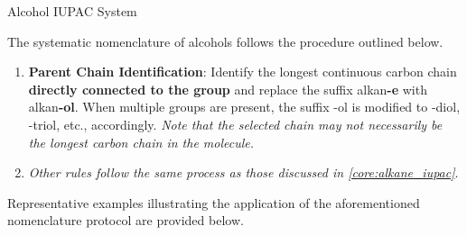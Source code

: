\documentclass[10pt]{article}
\begin{document}
      \begin{core}[label=core:alcohol_iupac]{Alcohol IUPAC System}

        The systematic nomenclature of alcohols follows the procedure outlined below.

        \begin{enumerate}[label=(\arabic*)]

          \item \textbf{Parent Chain Identification}: Identify the longest continuous carbon chain \textbf{directly connected to the  group} and replace the suffix alkan\textbf{-e} with alkan\textbf{-ol}. When multiple  groups are present, the suffix -ol is modified to -diol, -triol, etc., accordingly. \textit{Note that the selected chain may not necessarily be the longest carbon chain in the molecule.}


          \item \textit{Other rules follow the same process as those discussed in \autoref{core:alkane_iupac}}.

        \end{enumerate}

        Representative examples illustrating the application of the aforementioned nomenclature protocol are provided below.


\end{core}
\end{document}

